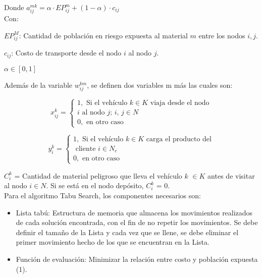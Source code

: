 \documentclass[conference]{IEEEtran}
\begin{document}
Donde $a^{mk}_{ij} = \alpha \cdot EP^m_{ij} + (1 - \alpha) \cdot c_{ij} $
\\

Con:

$EP^M_{ij}$: Cantidad de poblaci\'on en riesgo expuesta al material $m$ entre los nodos $i, j$.

$c_{ij}$: Costo de transporte desde el nodo $i$ al nodo $j$.

$\alpha \in [0,1]$

Adem\'as de la variable $w^{km}_{ij}$, se definen dos variables m m\'as las cuales son:

\begin{equation*}
        x^{k}_{ij} =     
    \begin{cases}
      1, \text{ Si el  veh\'iculo $k$} \in \text{$K$ viaja desde el nodo}  \\ \text{$i$ al nodo $j$; $i$, $j$} \in \text{$N$}
      \\
      0, \text{ en otro caso}
    \end{cases}
    \end{equation*}

\begin{equation*}
        y^{k}_{i} =     
    \begin{cases}
      1, \text{ Si el  veh\'iculo $k$} \in \text{$K$ carga el producto del}  \\ \text{ cliente $i$} \in \text{$N_c$}
      \\
      0, \text{ en otro caso}
    \end{cases}
    \end{equation*}
    

$C^{k}_{i}$ = Cantidad de material peligroso que lleva el veh\'iculo $k$  $\in K$ antes de visitar al nodo $i \in N$. Si se est\'a en el nodo dep\'osito,  $C^{k}_{i}$ = 0. 
\\

Para el algoritmo Tabu Search, los componentes necesarios son:

\begin{itemize}

    \item Lista tab\'u: Estructura de memoria que almacena los movimientos realizados de cada soluci\'on encontrada, con el fin de no repetir los movimientos. Se debe definir el tama\~no de la Lista y cada vez que se llene, se debe eliminar el primer movimiento hecho de los que se encuentran en la Lista.
    
    \item Funci\'on de evaluaci\'on: Minimizar la relaci\'on entre costo y poblaci\'on expuesta (1).
    
\end{itemize}
\end{document}
